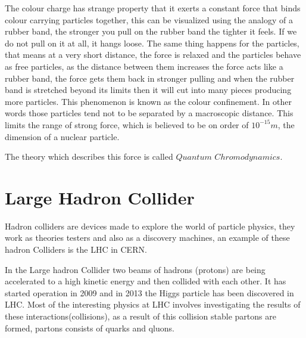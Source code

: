 The colour charge has strange property that it exerts a constant force that binds colour carrying particles together, this can be visualized using the analogy of a rubber band, the stronger you pull on the rubber band the tighter it feels.
If we do not pull on it at all, it hangs loose.
The same thing happens for the particles,  that means at a very short distance, the force is relaxed and the particles behave as free particles,
as the distance between them increases the force acts
like a rubber band, the force gets
them back in stronger pulling
and when the rubber band is stretched beyond its limits then it will cut into many pieces producing more particles.
This phenomenon is known as the colour confinement. In other words those particles
tend not to be
separated by a macroscopic distance.
This limits the range of strong force, which is believed to be on order of $10^{-15}\si{m}$,
the dimension of a nuclear particle.

The theory which describes this force is called $Quantum$ $Chromodynamics$.

\section{Large Hadron Collider}

Hadron colliders are devices made to explore the world of particle physics, they work as theories testers and also as a discovery machines, an example of these hadron Colliders is the LHC in CERN.

In the Large hadron Collider
two beams of hadrons (protons)
are being accelerated to a high kinetic energy and then collided with each other. It has started operation in 2009 and in 2013 the Higgs particle has been discovered in LHC. Most of the interesting physics at LHC involves investigating the results of these interactions(collisions), as a result of this collision stable partons are formed, partons consists of quarks and qluons.

